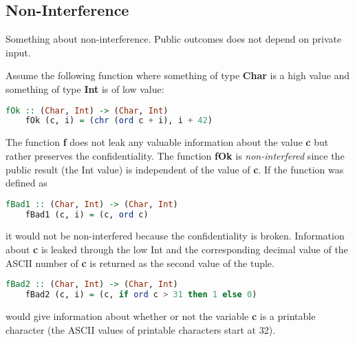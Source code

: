 \subsection{Non-Interference}
Something about non-interference. Public outcomes does not depend on private input.

Assume the following function where something of type \textbf{Char} is a high value and something of type \textbf{Int} is of low value:
\begin{center}
  \begin{lstlisting}[language=Haskell]
    fOk :: (Char, Int) -> (Char, Int)
    fOk (c, i) = (chr (ord c + i), i + 42)
  \end{lstlisting}
\end{center}
The function \textbf{f} does not leak any valuable information about the value \textbf{c} but rather preserves the confidentiality. The function \textbf{fOk} is \emph{non-interfered} since the public result (the Int value) is independent of the value of \textbf{c}. If the function was defined as
\begin{center}
  \begin{lstlisting}[language=Haskell]
    fBad1 :: (Char, Int) -> (Char, Int)
    fBad1 (c, i) = (c, ord c)
  \end{lstlisting}
\end{center}
it would not be non-interfered because the confidentiality is broken. Information about \textbf{c} is leaked through the low Int and the corresponding decimal value of the ASCII number of \textbf{c} is returned as the second value of the tuple.

\begin{center}
  \begin{lstlisting}[language=Haskell]
    fBad2 :: (Char, Int) -> (Char, Int)
    fBad2 (c, i) = (c, if ord c > 31 then 1 else 0)
  \end{lstlisting}
\end{center}
would give information about whether or not the variable \textbf{c} is a printable character (the ASCII values of printable characters start at 32\cite{ascii}).\cite{seclib}

